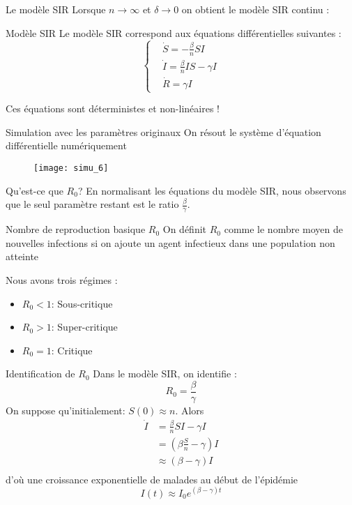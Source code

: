 \documentclass[10pt]{beamer}
\begin{document}
\begin{frame}{Le modèle SIR}
  Lorsque $n\to \infty$ et $\delta \to 0$
  on obtient le modèle SIR continu :

  \begin{block}{Modèle SIR}
    Le modèle SIR correspond aux équations différentielles suivantes :
    \[
      \left\{
        \begin{aligned}
          & \dot{S} = - \frac{\beta}{n} S I \\
          & \dot{I} = \frac{\beta}{n} I S - \gamma I \\
          & \dot{R} = \gamma I
        \end{aligned}
      \right.
    \]
  \end{block}
  Ces équations sont déterministes et non-linéaires !
\end{frame}

\begin{frame}{Simulation avec les paramètres originaux}
  On résout le système d'équation différentielle numériquement
  \begin{figure}
    \texttt{[image: simu\_6]}
  \end{figure}
\end{frame}

\begin{frame}{Qu'est-ce que $R_0$?}
  En normalisant les équations du modèle SIR, nous observons que le seul
  paramètre restant est le ratio $\frac{\beta}{\gamma}$.

  \begin{block}{Nombre de reproduction basique $R_0$}
   On définit $R_0$ comme le nombre moyen de nouvelles infections si on
   ajoute un agent infectieux dans une population non atteinte
  \end{block}

  Nous avons trois régimes :
  \begin{itemize}
    \item $R_0 < 1$: Sous-critique
    \item $R_0 > 1$: Super-critique
    \item $R_0 = 1$: Critique
  \end{itemize}
\end{frame}

\begin{frame}{Identification de $R_0$}
  Dans le modèle SIR, on identifie :
  \[
    R_0 = \frac{\beta}{\gamma}
  \]
  On suppose qu'initialement: $S(0) \approx n$. Alors
  \[
    \begin{aligned}
      \dot{I} &= \frac{\beta}{n} S I - \gamma I  \\
              &= (\beta \frac{S}{n} - \gamma) I \\
              &\approx (\beta  - \gamma) I \\
    \end{aligned}
  \]
  d'où une croissance exponentielle de malades au début de l'épidémie
  \[
  I(t) \approx I_0 e^{(\beta - \gamma)t}
  \]
\end{frame}
\end{document}
